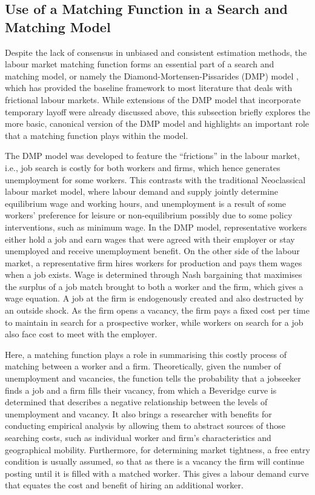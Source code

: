 \documentclass[a4paper, 11pt, tikz]{article}
\begin{document}
\subsection{Use of a Matching Function in a Search and Matching Model}
Despite the lack of consensus in unbiased and consistent estimation methods, the labour market matching function forms an essential part of a search and matching model, or namely the Diamond-Mortensen-Pissarides (DMP) model \citep{mortensen1994job}, which has provided the baseline framework to most literature that deals with frictional labour markets.
While extensions of the DMP model that incorporate temporary layoff were already discussed above, this subsection briefly explores the more basic, canonical version of the DMP model and highlights an important role that a matching function plays within the model.

The DMP model was developed to feature the ``frictions'' in the labour market, i.e., job search is costly for both workers and firms, which hence generates unemployment for some workers.
This contrasts with the traditional Neoclassical labour market model, where labour demand and supply jointly determine equilibrium wage and working hours, and unemployment is a result of some workers' preference for leisure or non-equilibrium possibly due to some policy interventions, such as minimum wage.
In the DMP model, representative workers either hold a job and earn wages that were agreed with their employer or stay unemployed and receive unemployment benefit.
On the other side of the labour market, a representative firm hires workers for production and pays them wages when a job exists.
Wage is determined through Nash bargaining that maximises the surplus of a job match brought to both a worker and the firm, which gives a wage equation.
A job at the firm is endogenously created and also destructed by an outside shock.
As the firm opens a vacancy, the firm pays a fixed cost per time to maintain in search for a prospective worker, while workers on search for a job also face cost to meet with the employer.

Here, a matching function plays a role in summarising this costly process of matching between a worker and a firm.
Theoretically, given the number of unemployment and vacancies, the function tells the probability that a jobseeker finds a job and a firm fills their vacancy, from which a Beveridge curve is determined that describes a negative relationship between the levels of unemployment and vacancy.
It also brings a researcher with benefits for conducting empirical analysis by allowing them to abstract sources of those searching costs, such as individual worker and firm's characteristics and geographical mobility.
Furthermore, for determining market tightness, a free entry condition is usually assumed, so that as there is a vacancy the firm will continue posting until it is filled with a matched worker.
This gives a labour demand curve that equates the cost and benefit of hiring an additional worker.
\end{document}
